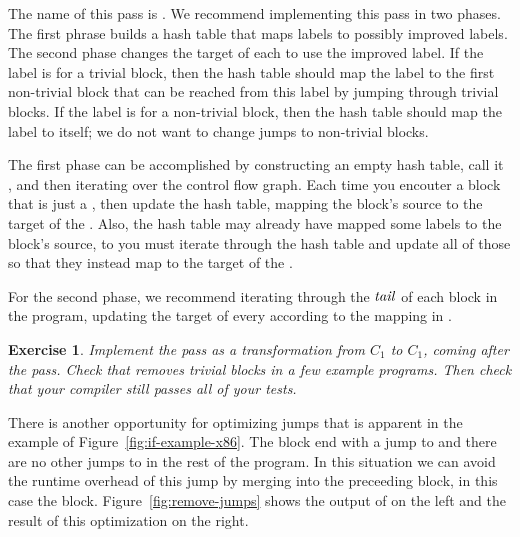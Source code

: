 \documentclass[11pt]{book}
\newtheorem{exercise}[theorem]{Exercise}
\begin{document}
The name of this pass is .  We recommend
implementing this pass in two phases. The first phrase builds a hash
table that maps labels to possibly improved labels. The second phase
changes the target of each  to use the improved label.  If
the label is for a trivial block, then the hash table should map the
label to the first non-trivial block that can be reached from this
label by jumping through trivial blocks.  If the label is for a
non-trivial block, then the hash table should map the label to itself;
we do not want to change jumps to non-trivial blocks.

The first phase can be accomplished by constructing an empty hash
table, call it , and then iterating over the control
flow graph. Each time you encouter a block that is just a ,
then update the hash table, mapping the block's source to the target
of the . Also, the hash table may already have mapped some
labels to the block's source, to you must iterate through the hash
table and update all of those so that they instead map to the target
of the .

For the second phase, we recommend iterating through the $\mathit{tail}$ of
each block in the program, updating the target of every 
according to the mapping in .

\begin{exercise}\normalfont
  Implement the  pass as a transformation from
  $C_1$ to $C_1$, coming after the  pass.
  Check that  removes trivial blocks in a few
  example programs. Then check that your compiler still passes all of
  your tests.
\end{exercise}

There is another opportunity for optimizing jumps that is apparent in
the example of Figure~\ref{fig:if-example-x86}. The  block
end with a jump to  and there are no other jumps to
 in the rest of the program. In this situation we can
avoid the runtime overhead of this jump by merging 
into the preceeding block, in this case the  block.
Figure~\ref{fig:remove-jumps} shows the output of
 on the left and the result of this
optimization on the right.
\end{document}
